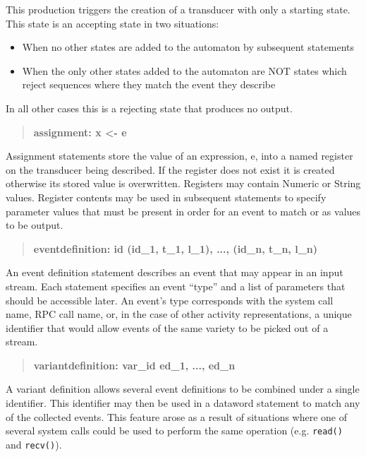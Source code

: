 This production triggers the creation of a transducer with only a starting
state.  This state is an accepting state in two situations:
\begin{itemize}
  \item{When no other states are added to the automaton by subsequent
    statements}
  \item{When the only other states added to the automaton are NOT states
    which reject sequences where they match the event they describe}
\end{itemize}
In all other cases this is a rejecting state that produces no output.

\begin{quote}
\centering
\textbf{assignment: x <- e}
\end{quote}

Assignment statements store the value of an expression, e, into a named
register on the transducer being described.  If the register does not exist
it is created otherwise its stored value is overwritten.
Registers may contain Numeric or String values.  Register contents
may be used in subsequent statements to specify parameter values that must
be present in order for an event to match or as values to be output.

\begin{quote}
\centering
\textbf{eventdefinition: id (id\_1, t\_1, l\_1), ..., (id\_n, t\_n, l\_n) }
\end{quote}


An event definition statement describes an event that may appear in an input
stream.  Each statement specifies an event ``type'' and a list of
parameters that should be accessible later.  An event's type corresponds
with the system call name, RPC call name, or, in the case of other activity
representations, a unique identifier that would allow events of the same
variety to be picked out of a stream.

\begin{quote}
\centering
\textbf{variantdefinition: var\_id ed\_1, ..., ed\_n}
\end{quote}

A variant definition allows several event definitions to be combined under
a single identifier.  This identifier may then be used in a dataword
statement to match any of the collected events.  This feature arose as a
result of situations where one of several system calls could be used to
perform the same operation (e.g. {\tt read()} and {\tt recv()}).

